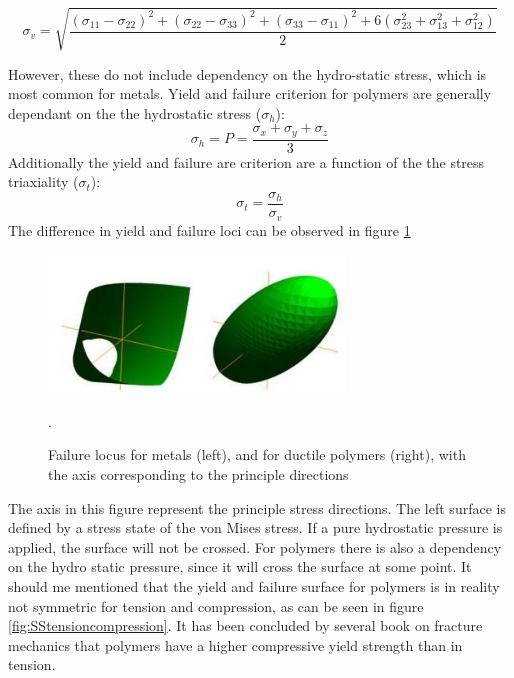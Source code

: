 \begin{equation}\label{von mises}
\sigma_v=\sqrt{\frac{(\sigma_{11}-\sigma_{22})^2+(\sigma_{22}-\sigma_{33})^2+(\sigma_{33}-\sigma_{11})^2 +6(\sigma_{23}^2+\sigma_{13}^2+\sigma_{12}^2)}{2}} 
\end{equation}


However, these do not include dependency on the hydro-static stress, which is most common for metals. Yield and failure criterion for polymers are generally dependant on the the hydrostatic stress ($\sigma_h$):
\begin{equation} \label{eqn:Me}
  \sigma_h=P=\frac{\sigma_x+\sigma_y+\sigma_z}{3}
\end{equation}
Additionally the yield and failure are criterion are a function of the the stress triaxiality ($\sigma_t$):
\begin{equation}\label{AzziTsai}
\sigma_t=\frac{\sigma_h}{\sigma_v}
\end{equation}
The difference in yield and failure loci can be observed in figure \ref{fig:yieldloci}
\begin{figure}[H]
    \centering
    \includegraphics[width=0.7\textwidth]{chapter_2/figures/yieldloci.png}
    \caption{Failure locus for metals (left), and for ductile polymers (right), with the axis corresponding to the principle directions \cite{Christensen2013TheFailure}}.
    \label{fig:yieldloci}
\end{figure}
The axis in this figure represent the principle stress directions. The left surface is defined by a stress state of the von Mises stress. If a pure hydrostatic pressure is applied, the surface will not be crossed. For polymers there is also a dependency on the hydro static pressure, since it  will cross the surface at some point.  
It should me mentioned that the yield and failure surface for polymers is in reality not symmetric for tension and compression, as can be seen in figure \ref{fig:SStensioncompression}. It has been concluded by several book on fracture mechanics \cite{Janssen2014Co_magmeasurewD.pdf} that polymers have a higher compressive yield strength than in tension. 
